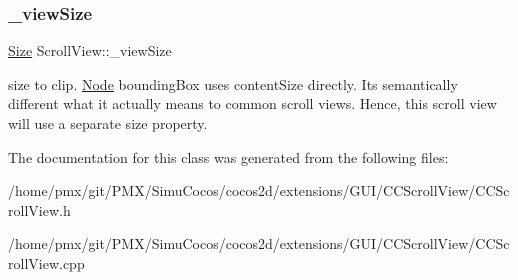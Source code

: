 \subsubsection{\texorpdfstring{\+\_\+view\+Size}{\_viewSize}}
{\footnotesize\ttfamily \hyperlink{classSize}{Size} Scroll\+View\+::\+\_\+view\+Size\hspace{0.3cm}{\ttfamily [protected]}}

size to clip. \hyperlink{classNode}{Node} bounding\+Box uses content\+Size directly. It\textquotesingle{}s semantically different what it actually means to common scroll views. Hence, this scroll view will use a separate size property. 

The documentation for this class was generated from the following files\+:\begin{DoxyCompactItemize}
\item 
/home/pmx/git/\+P\+M\+X/\+Simu\+Cocos/cocos2d/extensions/\+G\+U\+I/\+C\+C\+Scroll\+View/C\+C\+Scroll\+View.\+h\item 
/home/pmx/git/\+P\+M\+X/\+Simu\+Cocos/cocos2d/extensions/\+G\+U\+I/\+C\+C\+Scroll\+View/C\+C\+Scroll\+View.\+cpp\end{DoxyCompactItemize}
